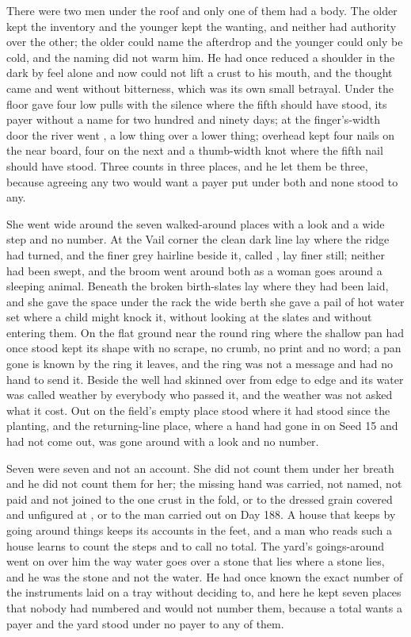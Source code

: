 There were two men under the roof and only one of them had a body. The older kept the inventory and the younger kept the wanting, and neither had authority over the other; the older could name the afterdrop and the younger could only be cold, and the naming did not warm him. He had once reduced a shoulder in the dark by feel alone and now could not lift a crust to his mouth, and the thought came and went without bitterness, which was its own small betrayal. Under the floor  gave four low pulls with the silence where the fifth should have stood, its payer without a name for two hundred and ninety days; at the finger's-width door the river went , a low thing over a lower thing; overhead  kept four nails on the near board, four on the next and a thumb-width knot where the fifth nail should have stood. Three counts in three places, and he let them be three, because agreeing any two would want a payer put under both and none stood to any.

\scenebreak

She went wide around the seven walked-around places with a look and a wide step and no number. At the Vail corner the clean dark line lay where the  ridge had turned, and the finer grey hairline beside it, called , lay finer still; neither had been swept, and the broom went around both as a woman goes around a sleeping animal. Beneath  the broken birth-slates lay where they had been laid, and she gave the space under the rack the wide berth she gave a pail of hot water set where a child might knock it, without looking at the slates and without entering them. On the flat ground near  the round ring where the shallow pan had once stood kept its shape with no scrape, no crumb, no print and no word; a pan gone is known by the ring it leaves, and the ring was not a message and had no hand to send it. Beside the well  had skinned over from edge to edge and its water was called weather by everybody who passed it, and the weather was not asked what it cost. Out on  the field's empty place stood where it had stood since the planting, and the returning-line place, where a hand had gone in on Seed 15 and had not come out, was gone around with a look and no number.

Seven were seven and not an account. She did not count them under her breath and he did not count them for her; the missing hand was carried, not named, not paid and not joined to the one crust in the fold, or to the dressed grain covered and unfigured at , or to the man carried out on Day 188. A house that keeps by going around things keeps its accounts in the feet, and a man who reads such a house learns to count the steps and to call no total. The yard's goings-around went on over him the way water goes over a stone that lies where a stone lies, and he was the stone and not the water. He had once known the exact number of the instruments laid on a tray without deciding to, and here he kept seven places that nobody had numbered and would not number them, because a total wants a payer and the yard stood under no payer to any of them.

